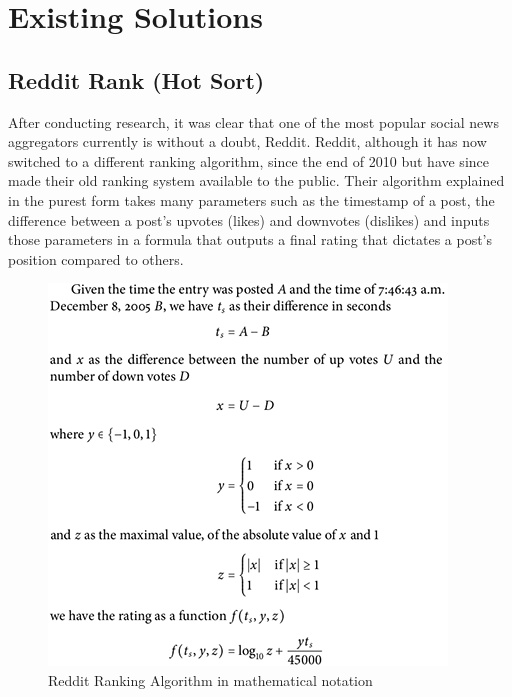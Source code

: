 \section{Existing Solutions}

\subsection {Reddit Rank (Hot Sort)}
After conducting research, it was clear that one of the most popular social news aggregators currently is without a doubt, Reddit. Reddit, although it has now switched to a different ranking algorithm, since the end of 2010 but have since made their old ranking system available to the public. Their algorithm explained in the purest form takes many parameters such as the timestamp of a post, the difference between a post’s upvotes (likes) and downvotes (dislikes) and inputs those parameters in a formula that outputs a final rating that dictates a post’s position compared to others.


\begin{figure}[htbp]
\begin{minipage}[t]{\linewidth}
  \centering
    \includegraphics[scale=0.6]{Figures/reddit_rank}
    \caption{Reddit Ranking Algorithm in mathematical notation}
    \label{reddit_rank}
\end{minipage}%
\end{figure}

